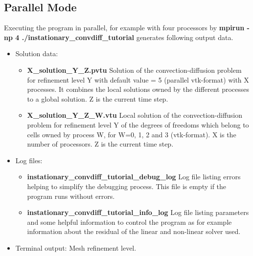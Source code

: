 \documentclass[a4paper, 11pt, twoside]{article}
\begin{document}
\subsection{Parallel Mode} 
Executing the program in parallel, for example with four processors by \textbf{mpirun -np 4 ./instationary\_convdiff\_tutorial}   
generates following output data. 
\begin{itemize}
\item Solution data:
\begin{itemize}
\item \textbf{X\_solution\_Y\_Z.pvtu} Solution of the convection-diffusion problem for refinement level Y with default value = 5 (parallel vtk-format) with X processes. It combines the local solutions owned by the different processes to a global solution. Z is the current time step.
\item \textbf{X\_solution\_Y\_Z\_W.vtu} Local solution of the convection-diffusion problem for refinement level Y of the degrees of freedoms which belong to cells owned by process W, for W=0, 1, 2 and 3 (vtk-format). X is the number of processors. Z is the current time step.
\end{itemize}
\item Log files:
\begin{itemize}
\item \textbf{instationary\_convdiff\_tutorial\_debug\_log} Log file listing errors helping to simplify the debugging process. This file is empty if the program runs without errors.
\item \textbf{instationary\_convdiff\_tutorial\_info\_log} Log file listing parameters and some helpful information to control 
      the program as for example information about the residual of the linear and non-linear solver used.
\end{itemize}
\item Terminal output: Mesh refinement level.
\end{itemize}
\end{document}
